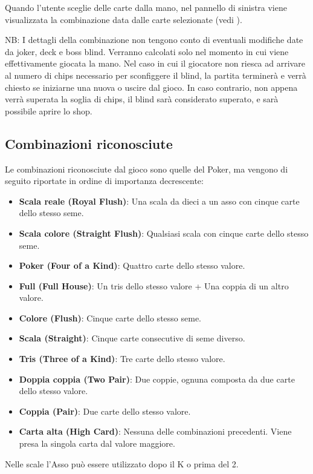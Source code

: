 \documentclass[a4paper,12pt]{report}
\begin{document}
Quando l'utente sceglie delle carte dalla mano, nel pannello di sinistra viene visualizzata la combinazione data dalle carte selezionate (vedi ).

NB: I dettagli della combinazione non tengono conto di eventuali modifiche date da joker, deck e boss blind. Verranno calcolati solo nel momento in cui viene effettivamente giocata la mano.
Nel caso in cui il giocatore non riesca ad arrivare al numero di chips necessario per sconfiggere il blind, la partita terminerà e verrà chiesto se iniziarne una nuova o uscire dal gioco.
In caso contrario, non appena verrà superata la soglia di chips, il blind sarà considerato superato, e sarà possibile aprire lo shop.

\subsection{Combinazioni riconosciute}
Le combinazioni riconosciute dal gioco sono quelle del Poker, ma vengono di seguito riportate in ordine di importanza decrescente:
\begin{itemize}
	\item \textbf{Scala reale (Royal Flush)}: Una scala da dieci a un asso con cinque carte dello stesso seme.
	\item \textbf{Scala colore (Straight Flush)}: Qualsiasi scala con cinque carte dello stesso seme.
	\item \textbf{Poker (Four of a Kind)}: Quattro carte dello stesso valore.
	\item \textbf{Full (Full House)}: Un tris dello stesso valore + Una coppia di un altro valore.
	\item \textbf{Colore (Flush)}: Cinque carte dello stesso seme.
	\item \textbf{Scala (Straight)}: Cinque carte consecutive di seme diverso.
	\item \textbf{Tris (Three of a Kind)}: Tre carte dello stesso valore.
	\item \textbf{Doppia coppia (Two Pair)}: Due coppie, ognuna composta da due carte dello stesso valore.
	\item \textbf{Coppia (Pair)}: Due carte dello stesso valore.
	\item \textbf{Carta alta (High Card)}: Nessuna delle combinazioni precedenti. Viene presa la singola carta dal valore maggiore.
\end{itemize}
Nelle scale l'Asso può essere utilizzato dopo il K o prima del 2.
\end{document}
